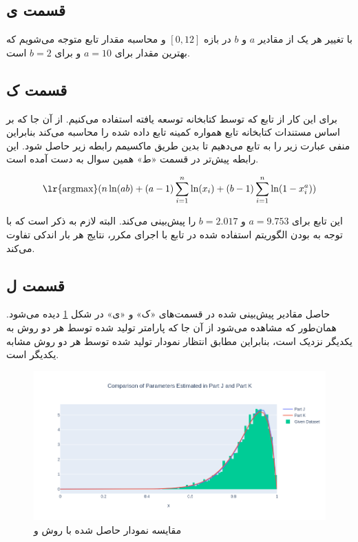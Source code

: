 \documentclass{article}
\begin{document}
\subsection*{قسمت ی}

با تغییر هر یک از مقادیر $a$ و $b$ در بازه $[0,12]$ و محاسبه مقدار تابع  متوجه می‌شویم که
بهترین مقدار برای $a=10$ و برای $b=2$ است.

\subsection*{قسمت ک}

برای این کار از تابع  که توسط کتابخانه  توسعه یافته استفاده
می‌کنیم. از آن جا که بر اساس مستندات کتابخانه  تابع  همواره
کمینه تابع داده شده را محاسبه می‌کند بنابراین منفی عبارت زیر را به تابع می‌دهیم تا بدین طریق ماکسیمم
رابطه زیر حاصل شود. این رابطه پیش‌تر در قسمت «ط» همین سوال به دست آمده است.

$$\text{\lr{argmax}}(n\ln(ab) + (a-1) \sum_{i=1}^{n} \ln(x_i) + (b-1) \sum_{i=1}^{n} \ln(1-x_i^{a}))$$

این تابع برای $a=9.753$ و $b=2.017$ را پیش‌بینی می‌کند. البته لازم به ذکر است که با توجه به بودن
الگوریتم استفاده شده در تابع  با اجرای مکرر،
نتایج هر بار اندکی تفاوت می‌کند.

\subsection*{قسمت ل}

حاصل مقادیر پیش‌بینی شده در قسمت‌های «ک» و «ی» در شکل \ref{comparison-stochastic-likelihood} دیده می‌شود.
همان‌طور که مشاهده می‌شود از آن جا که پارامتر تولید شده توسط هر دو روش به یکدیگر نزدیک است،
بنابراین مطابق انتظار نمودار تولید شده توسط هر دو روش مشابه یکدیگر است.

\begin{figure}[h]
    \centering
    \includegraphics[scale=0.3]{images/q4/comparison_stochastic_likelihood.png}
    \caption{مقایسه نمودار حاصل شده با روش  و }
    \label{comparison-stochastic-likelihood}
\end{figure}
\end{document}

